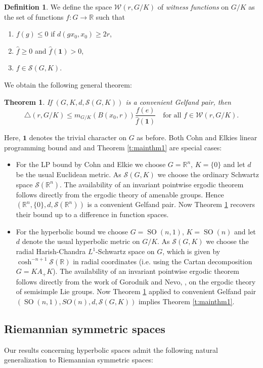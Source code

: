 \documentclass[12pt,reqno,a4paper]{amsart}
\theoremstyle{theorem}
\newtheorem{mainthm}{Theorem}
\theoremstyle{definition}
\newtheorem{definition}[theorem]{Definition}
\numberwithin{theorem}{section}
\numberwithin{equation}{section}
\newcommand{\SO}{\operatorname{SO}}
\newcommand{\R}{\mathbb{R}}
\begin{document}
\begin{definition}
	We define the space $\mathcal{W}(r, G/K)$ of \emph{witness functions} on $G/K$ as the set of functions $f:G\to \R$ such that 
\begin{enumerate}[(W1)]
	\item $f(g)\leq 0$ if $d(gx_0, x_0)\geq 2r$,
	\item $\widehat{f}\geq 0$ and $\widehat{f}(\mathbf{1})>0$,
	\item $f\in \mathcal{S}(G,K)$.
\end{enumerate} 

\end{definition}
We obtain the following general theorem:
\begin{mainthm}\label{t:mainthm2}
	If $(G,K, d, \mathcal{S}(G, K))$ is a convenient Gelfand pair, then 
	\[\triangle(r,G/K)\leq m_{G/K}(B(x_0, r))\frac{f(e)}{\widehat{f}(\mathbf{1})} 
	\quad \text{for all } f\in \mathcal{W}(r,G/K).\]
\end{mainthm}
Here, $\mathbf{1}$ denotes the trivial character on $G$ as before. Both Cohn and Elkies linear programming bound and and Theorem \ref{t:mainthm1} are special cases: 
\begin{itemize}
\item For the LP bound by Cohn and Elkie we choose $G=\R^n$, $K=\{0\}$ and let $d$ be the usual Euclidean metric. As $\mathcal{S}(G, K)$ we choose the ordinary Schwartz space $\mathscr{S}(\R^n)$. The availability of an invariant pointwise ergodic theorem follows directly from the ergodic theory of amenable groups. Hence $(\R^n, \{0\}, d, \mathscr{S}(\R^n))$ is a convenient Gelfand pair. Now Theorem \ref{t:mainthm2} recovers their bound up to a difference in function spaces. 
\item For the hyperbolic bound we choose $G=\SO(n,1)$, $K= \SO(n)$ and let $d$ denote the usual hyperbolic metric on $G/K$. As $\mathcal{S}(G, K)$ we choose the radial Harish-Chandra $L^1$-Schwartz space on $G$, which is given by $\cosh^{-n+1}\mathscr{S}(\R)$ in radial coordinates (i.e. using the Cartan decomposition $G=KA_+K$). The availability of an invariant pointwise ergodic theorem follows directly from the work of Gorodnik and Nevo, \cite{GorodnikNevo}, on the ergodic theory of semisimple Lie groups. Now Theorem \ref{t:mainthm2} applied to convenient Gelfand pair $(\SO(n,1), SO(n), d, \mathcal{S}(G, K))$ implies Theorem \ref{t:mainthm1}.
\end{itemize}

\subsection{Riemannian symmetric spaces}
Our results concerning hyperbolic spaces admit the following natural generalization to Riemannian symmetric spaces: 
\end{document}
